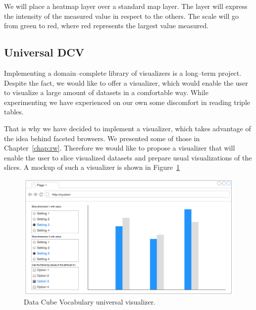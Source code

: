 We will place a heatmap layer over a standard map layer. The layer will express 
the intensity of the measured value in respect to the others. The scale will go from 
green to red, where red represents the largest value measured.

\subsection{Universal DCV}
Implementing a domain--complete library of visualizers is a long--term project. 
Despite the fact, we would like to offer a visualizer, which would enable the 
user to visualize a large amount of datasets in a comfortable way. While experimenting we have experienced on our own some discomfort in reading triple tables.

That is why we have decided to implement a visualizer, which takes advantage of 
the idea behind faceted browsers. We presented some of those in 
Chapter~\ref{chap:rw}. Therefore we would like to propose a visualizer that will 
enable the user to slice visualized datasets and prepare usual visualizations of 
the slices. A mockup of such a visualizer is shown in 
Figure~\ref{fig:dcv-universal}

\begin{figure}
	\centering
	\includegraphics[width=140mm]{img/dcv-universal.png}
	\caption{Data Cube Vocabulary universal visualizer.}
	\label{fig:dcv-universal}
\end{figure}



